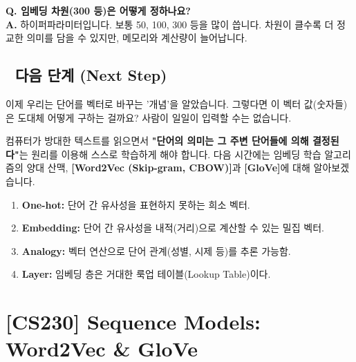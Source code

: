 \documentclass[11pt,a4paper]{book}
\theoremstyle{definition}
\begin{document}
\textbf{Q. 임베딩 차원(300 등)은 어떻게 정하나요?} \\
\textbf{A.} 하이퍼파라미터입니다. 보통 50, 100, 300 등을 많이 씁니다. 차원이 클수록 더 정교한 의미를 담을 수 있지만, 메모리와 계산량이 늘어납니다.

\section*{🔗 다음 단계 (Next Step)}
이제 우리는 단어를 벡터로 바꾸는 '개념'을 알았습니다. 그렇다면 이 벡터 값(숫자들)은 도대체 어떻게 구하는 걸까요? 사람이 일일이 입력할 수는 없습니다.

컴퓨터가 방대한 텍스트를 읽으면서 \textbf{"단어의 의미는 그 주변 단어들에 의해 결정된다"}는 원리를 이용해 스스로 학습하게 해야 합니다.
다음 시간에는 임베딩 학습 알고리즘의 양대 산맥, \textbf{[Word2Vec (Skip-gram, CBOW)]}과 \textbf{[GloVe]}에 대해 알아보겠습니다.

\vspace{0.5cm}

\begin{summarybox}[title={단원 요약 (Cheat Sheet)}]
\begin{enumerate}
    \item \textbf{One-hot:} 단어 간 유사성을 표현하지 못하는 희소 벡터.
    \item \textbf{Embedding:} 단어 간 유사성을 내적(거리)으로 계산할 수 있는 밀집 벡터.
    \item \textbf{Analogy:} 벡터 연산으로 단어 관계(성별, 시제 등)를 추론 가능함.
    \item \textbf{Layer:} 임베딩 층은 거대한 룩업 테이블(Lookup Table)이다.
\end{enumerate}
\end{summarybox}


\chapter{[CS230] Sequence Models: \\ Word2Vec \& GloVe}
\label{ch:lecture44}

\end{document}
